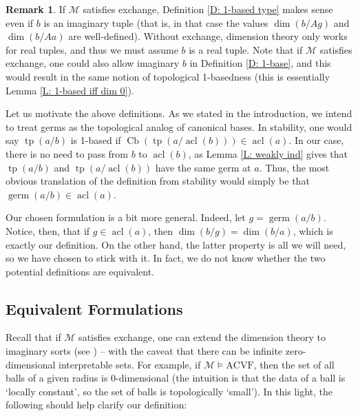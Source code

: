 \documentclass{amsart}
\theoremstyle{definition}
\newtheorem{remark}[theorem]{Remark}
\newcommand{\acl}{\operatorname{acl}}
\newcommand{\tp}{\operatorname{tp}}
\begin{document}
\begin{remark} If $\mathcal M$ satisfies exchange, Definition \ref{D: 1-based type} makes sense even if $b$ is an imaginary tuple (that is, in that case the values $\dim(b/Ag)$ and $\dim(b/Aa)$ are well-defined). Without exchange, dimension theory only works for real tuples, and thus we must assume $b$ is a real tuple. Note that if $\mathcal M$ satisfies exchange, one could also allow imaginary $b$ in Definition \ref{D: 1-base}, and this would result in the same notion of topological 1-basedness (this is essentially Lemma \ref{L: 1-based iff dim 0}). 
\end{remark}

Let us motivate the above definitions. As we stated in the introduction, we intend to treat germs as the topological analog of canonical bases. In stability, one would say $\tp(a/b)$ is 1-based if $\operatorname{Cb}(\tp(a/\acl(b)))\in\acl(a)$. In our case, there is no need to pass from $b$ to $\acl(b)$, as Lemma \ref{L: weakly ind} gives that $\tp(a/b)$ and $\tp(a/\acl(b))$ have the same germ at $a$. Thus, the most obvious translation of the definition from stability would simply be that $\operatorname{germ}(a/b)\in\acl(a)$.

Our chosen formulation is a bit more general. Indeed, let $g=\operatorname{germ}(a/b)$. Notice, then, that if $g\in\acl(a)$, then $\dim(b/g)=\dim(b/a)$, which is exactly our definition. On the other hand, the latter property is all we will need, so we have chosen to stick with it. In fact, we do not know whether the two potential definitions are equivalent.

\subsection{Equivalent Formulations}

Recall that if $\mathcal M$ satisfies exchange, one can extend the dimension theory to imaginary sorts (see \cite[\S 3]{Gagelman}) -- with the caveat that there can be infinite zero-dimensional interpretable sets. For example, if $\mathcal M\models \mathrm{ACVF}$, then the set of all balls of a given radius is 0-dimensional (the intuition is that the data of a ball is `locally constant', so the set of balls is topologically `small'). In this light, the following should help clarify our definition:
\end{document}
